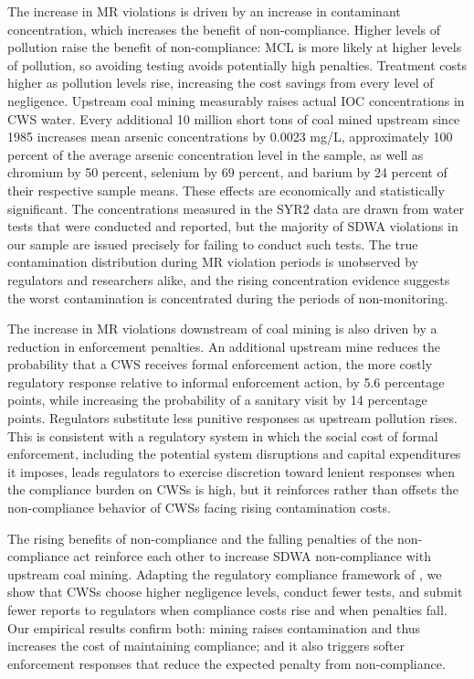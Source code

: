 \documentclass{article}
\begin{document}
The increase in MR violations is driven by an increase in contaminant concentration, which increases the benefit of non-compliance. Higher levels of pollution raise the benefit of non-compliance: MCL is more likely at higher levels of pollution, so avoiding testing avoids potentially high penalties. Treatment costs higher as pollution levels rise, increasing the cost savings from every level of negligence. Upstream coal mining measurably raises actual IOC concentrations in CWS water. Every additional 10 million short tons of coal mined upstream since 1985 increases mean arsenic concentrations by 0.0023 mg/L, approximately 100 percent of the average arsenic concentration level in the sample, as well as chromium by 50 percent, selenium by 69 percent, and barium by 24 percent of their respective sample means. These effects are economically and statistically significant. The concentrations measured in the SYR2 data are drawn from water tests that were conducted and reported, but the majority of SDWA violations in our sample are issued precisely for failing to conduct such tests. The true contamination distribution during MR violation periods is unobserved by regulators and researchers alike, and the rising concentration evidence suggests the worst contamination is concentrated during the periods of non-monitoring.

The increase in MR violations downstream of coal mining is also driven by a reduction in enforcement penalties. An additional upstream mine reduces the probability that a CWS receives formal enforcement action, the more costly regulatory response relative to informal enforcement action, by 5.6 percentage points, while increasing the probability of a sanitary visit by 14 percentage points. Regulators substitute less punitive responses as upstream pollution rises. This is consistent with a regulatory system in which the social cost of formal enforcement, including the potential system disruptions and capital expenditures it imposes, leads regulators to exercise discretion toward lenient responses when the compliance burden on CWSs is high, but it reinforces rather than offsets the non-compliance behavior of CWSs facing rising contamination costs.

The rising benefits of non-compliance and the falling penalties of the non-compliance act reinforce each other to increase SDWA non-compliance with upstream coal mining. Adapting the regulatory compliance framework of \cite{kang2021understanding}, we show that CWSs choose higher negligence levels, conduct fewer tests, and submit fewer reports to regulators when compliance costs rise and when penalties fall. Our empirical results confirm both: mining raises contamination and thus increases the cost of maintaining compliance; and it also triggers softer enforcement responses that reduce the expected penalty from non-compliance.
\end{document}
